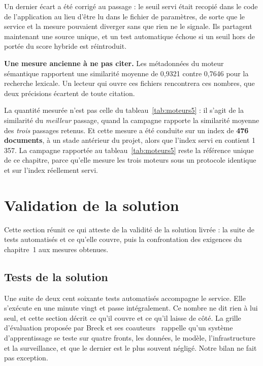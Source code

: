 Un dernier écart a été corrigé au passage : le seuil servi était recopié dans le code de
l'application au lieu d'être lu dans le fichier de paramètres, de sorte que le service et la mesure
pouvaient diverger sans que rien ne le signale. Ils partagent maintenant une source unique, et un
test automatique échoue si un seuil hors de portée du score hybride est réintroduit.

\textbf{Une mesure ancienne à ne pas citer.} Les métadonnées du moteur sémantique rapportent une similarité moyenne de 0,9321 contre 0,7646 pour
la recherche lexicale. Un lecteur qui ouvre ces fichiers rencontrera ces nombres, que deux
précisions écartent de toute citation.

La quantité mesurée n'est pas celle du tableau~\ref{tab:moteurs5} : il s'agit de la similarité du
\emph{meilleur} passage, quand la campagne rapporte la similarité moyenne des \emph{trois} passages
retenus. Et cette mesure a été conduite sur un index de \textbf{476 documents}, à un stade
antérieur du projet, alors que l'index servi en contient 1\,357. La campagne rapportée au
tableau~\ref{tab:moteurs5} reste la référence unique de ce chapitre, parce qu'elle mesure les trois
moteurs sous un protocole identique et sur l'index réellement servi.

\section{Validation de la solution}

\label{sec:validation7}

Cette section réunit ce qui atteste de la validité de la solution livrée : la suite de tests
automatisés et ce qu'elle couvre, puis la confrontation des exigences du chapitre~1 aux mesures
obtenues.

\subsection{Tests de la solution}

\label{sec:tests7}

Une suite de deux cent soixante tests automatisés accompagne le service. Elle s'exécute en
une minute vingt et passe intégralement. Ce nombre ne dit rien à lui seul, et cette section décrit
ce qu'il couvre et ce qu'il laisse de côté. La grille d'évaluation proposée par Breck et ses
coauteurs~\cite{breck2017} rappelle qu'un système d'apprentissage se teste sur quatre fronts, les
données, le modèle, l'infrastructure et la surveillance, et que le dernier est le plus souvent
négligé. Notre bilan ne fait pas exception.

